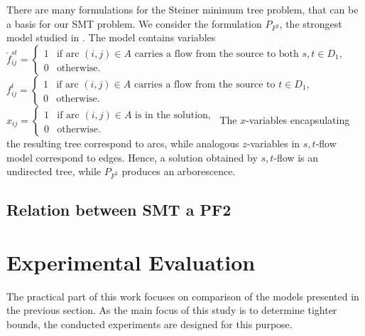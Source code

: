 There are many formulations for the Steiner minimum tree problem, that can be a basis for our SMT problem. We consider the formulation $P_{F^2}$, the strongest model studied in \cite{polzin}. The model contains variables
\newline\newline  
  $\check{f}^{st}_{ij}=
	\begin{cases}
    1 & \text{if arc $(i,j) \in A$ carries a flow from the source to both $s,t\in D_1$},\\
    0 & \text{otherwise}.
  \end{cases}$
\newline\newline  
  $f^{t}_{ij}=
	\begin{cases}
    1 & \text{if arc $(i,j) \in A$ carries a flow from the source to $t\in D_1$},\\
    0 & \text{otherwise}.
  \end{cases}$  
\newline\newline  
  $x_{ij}=
	\begin{cases}
    1 & \text{if arc $(i,j) \in A$ is in the solution},\\
    0 & \text{otherwise}.
  \end{cases}$  
\newline
\newline   
The $x$-variables encapsulating the resulting tree correspond to arcs, while analogous $z$-variables in $s,t$-flow model correspond to edges. Hence, a solution obtained by $s,t$-flow is an undirected tree, while $P_{F^2}$ produces an arborescence.
\subsection{Relation between SMT a PF2}
\section{Experimental Evaluation}

The practical part of this work focuses on comparison of the models presented in the previous section. As the main focus of this study is to determine tighter bounds, the conducted experiments are designed for this purpose. 

